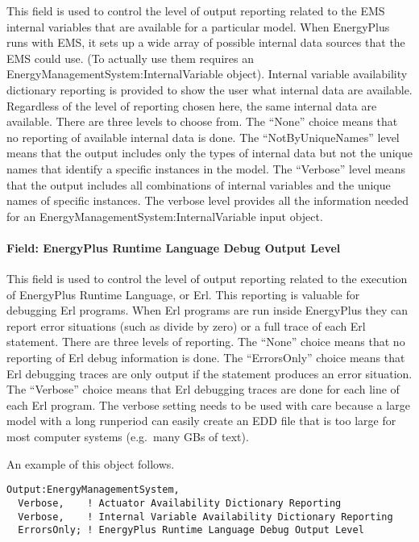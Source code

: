This field is used to control the level of output reporting related to the EMS internal variables that are available for a particular model. When EnergyPlus runs with EMS, it sets up a wide array of possible internal data sources that the EMS could use. (To actually use them requires an EnergyManagementSystem:InternalVariable object). Internal variable availability dictionary reporting is provided to show the user what internal data are available. Regardless of the level of reporting chosen here, the same internal data are available. There are three levels to choose from. The ``None'' choice means that no reporting of available internal data is done. The ``NotByUniqueNames'' level means that the output includes only the types of internal data but not the unique names that identify a specific instances in the model. The ``Verbose'' level means that the output includes all combinations of internal variables and the unique names of specific instances. The verbose level provides all the information needed for an EnergyManagementSystem:InternalVariable input object.

\paragraph{Field: EnergyPlus Runtime Language Debug Output Level}\label{field-energyplus-runtime-language-debug-output-level}

This field is used to control the level of output reporting related to the execution of EnergyPlus Runtime Language, or Erl. This reporting is valuable for debugging Erl programs. When Erl programs are run inside EnergyPlus they can report error situations (such as divide by zero) or a full trace of each Erl statement. There are three levels of reporting. The ``None'' choice means that no reporting of Erl debug information is done. The ``ErrorsOnly'' choice means that Erl debugging traces are only output if the statement produces an error situation. The ``Verbose'' choice means that Erl debugging traces are done for each line of each Erl program. The verbose setting needs to be used with care because a large model with a long runperiod can easily create an EDD file that is too large for most computer systems (e.g.~many GBs of text).

An example of this object follows.

\begin{lstlisting}
Output:EnergyManagementSystem,
  Verbose,    ! Actuator Availability Dictionary Reporting
  Verbose,    ! Internal Variable Availability Dictionary Reporting
  ErrorsOnly; ! EnergyPlus Runtime Language Debug Output Level
\end{lstlisting}

